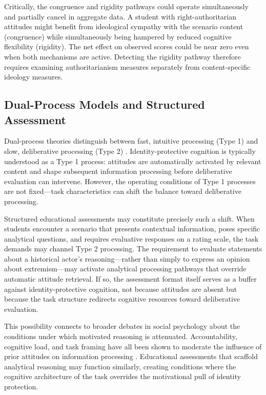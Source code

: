 \documentclass[referee,pdflatex,sn-apa]{sn-jnl}
\begin{document}
Critically, the congruence and rigidity pathways could operate simultaneously and partially cancel in aggregate data. A student with right-authoritarian attitudes might benefit from ideological sympathy with the scenario content (congruence) while simultaneously being hampered by reduced cognitive flexibility (rigidity). The net effect on observed scores could be near zero even when both mechanisms are active. Detecting the rigidity pathway therefore requires examining authoritarianism measures separately from content-specific ideology measures.

\subsection{Dual-Process Models and Structured Assessment}\label{subsec:dualprocess}

Dual-process theories distinguish between fast, intuitive processing (Type 1) and slow, deliberative processing (Type 2) \citep{Evans2013}. Identity-protective cognition is typically understood as a Type 1 process: attitudes are automatically activated by relevant content and shape subsequent information processing before deliberative evaluation can intervene. However, the operating conditions of Type 1 processes are not fixed---task characteristics can shift the balance toward deliberative processing.

Structured educational assessments may constitute precisely such a shift. When students encounter a scenario that presents contextual information, poses specific analytical questions, and requires evaluative responses on a rating scale, the task demands may channel Type 2 processing. The requirement to evaluate statements about a historical actor's reasoning---rather than simply to express an opinion about extremism---may activate analytical processing pathways that override automatic attitude retrieval. If so, the assessment format itself serves as a buffer against identity-protective cognition, not because attitudes are absent but because the task structure redirects cognitive resources toward deliberative evaluation.

This possibility connects to broader debates in social psychology about the conditions under which motivated reasoning is attenuated. Accountability, cognitive load, and task framing have all been shown to moderate the influence of prior attitudes on information processing \citep{Kunda1990}. Educational assessments that scaffold analytical reasoning may function similarly, creating conditions where the cognitive architecture of the task overrides the motivational pull of identity protection.
\end{document}

